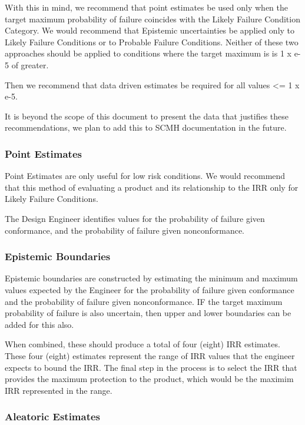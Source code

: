 \documentclass[
]{article}
\begin{document}
With this in mind, we recommend that point estimates be used only when the target maximum probability of failure coincides with the Likely Failure Condition Category. We would recommend that Epistemic uncertainties be applied only to Likely Failure Conditions or to Probable Failure Conditions. Neither of these two approaches should be applied to conditions where the target maximum is is 1 x e-5 of greater.

Then we recommend that data driven estimates be required for all values \textless= 1 x e-5.

It is beyond the scope of this document to present the data that justifies these recommendations, we plan to add this to SCMH documentation in the future.

\subsubsection{Point Estimates}\label{point-estimates-1}

Point Estimates are only useful for low risk conditions. We would recommend that this method of evaluating a product and its relationship to the IRR only for Likely Failure Conditions.

The Design Engineer identifies values for the probability of failure given conformance, and the probability of failure given nonconformance.

\subsubsection{Epistemic Boundaries}\label{epistemic-boundaries}

Epistemic boundaries are constructed by estimating the minimum and maximum values expected by the Engineer for the probability of failure given conformance and the probability of failure given nonconformance. IF the target maximum probability of failure is also uncertain, then upper and lower boundaries can be added for this also.

When combined, these should produce a total of four (eight) IRR estimates. These four (eight) estimates represent the range of IRR values that the engineer expects to bound the IRR. The final step in the process is to select the IRR that provides the maximum protection to the product, which would be the maximim IRR represented in the range.

\subsubsection{Aleatoric Estimates}\label{aleatoric-estimates-1}
\end{document}

